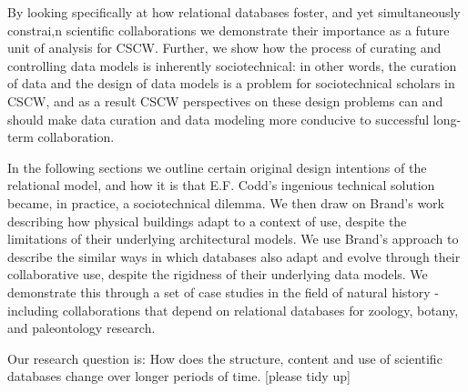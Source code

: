 By looking specifically at how relational databases foster, and yet simultaneously constrai,n scientific collaborations we demonstrate their importance as a future unit of analysis for CSCW. Further, we show how the process of curating and controlling data models is inherently sociotechnical: in other words, the curation of data and the design of data models is a problem for sociotechnical scholars in CSCW, and as a result CSCW perspectives on these design problems can and should make data curation and data modeling more conducive to successful long-term collaboration. 

In the following sections we outline certain original design intentions of the relational model, and how it is that E.F. Codd's ingenious technical solution became, in practice, a sociotechnical dilemma. We then draw on Brand's work describing how physical buildings adapt to a context of use, despite the limitations of their underlying architectural models. We use Brand's approach to describe the similar ways in which databases also adapt and evolve through their collaborative use, despite the rigidness of their underlying data models. We demonstrate this through a set of case studies in the field of natural history - including collaborations that depend on relational databases for zoology, botany, and paleontology research.  

Our research question is: How does the structure, content and use of scientific databases change over longer periods of time. [please tidy up]
